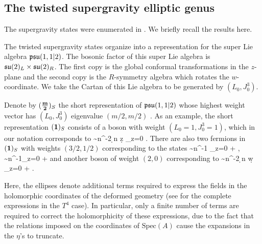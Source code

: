 \documentclass[../main.tex]{subfiles}
\begin{document}
%

\subsection{The twisted supergravity elliptic genus}
\label{s:sugraelliptic}

The supergravity states were enumerated in \cite{CP}. We briefly recall the results here. 

The twisted supergravity states organize into a representation for the super Lie algebra $\mathfrak{psu}(1,1|2)$.
The bosonic factor of this super Lie algebra is $\mathfrak{su}(2)_L \times \mathfrak{su}(2)_R$. 
The first copy is the global conformal transformations in the $z$-plane and the second copy is the $R$-symmetry algebra which rotates the $w$-coordinate.
We take the Cartan of this Lie algebra to be generated by $(L_0, J_0^3)$. 
  
Denote by $(\frac{\bf m}{\bf 2})_S$ the short representation of $\mathfrak{psu}(1,1|2)$ whose highest weight vector has $(L_0, J_0^3)$ eigenvalue $(m/2,m/2)$ \cite{deBoerEG}. 
As an example, the short representation $({\bf 1})_S$ consists of a boson with weight $(L_0 = 1, J_0^3 = 1)$, which in our notation corresponds to 
\beqn
\mu \sim n^{-2} \d \log n \d z \delta_{z=0}  .
\eeqn 
There are also two fermions in $({\bf 1})_S$ with weights $(3/2,1/2)$ corresponding to the states
\beqn
\alpha \sim n^{-1} \delta_{z=0} + \cdots , \quad \gamma \sim n^{-1}\delta_{z=0} + \cdots
\eeqn
and another boson of weight $(2,0)$ corresponding to 
\beqn
\mu \sim n^{-2} \d \log n \d w \delta_{z=0} + \cdots .
\eeqn 

Here, the ellipses denote additional terms required to express the fields in the holomorphic coordinates of the deformed geometry (see \cite{CP} for the complete expressions in the $T^4$ case). In particular, only a finite number of terms are required to correct the holomorphicity of these expressions, due to the fact that the relations imposed on the coordinates of $\textrm{Spec}(A)$ cause the expansions in the $\eta$'s to truncate. 
\end{document}
